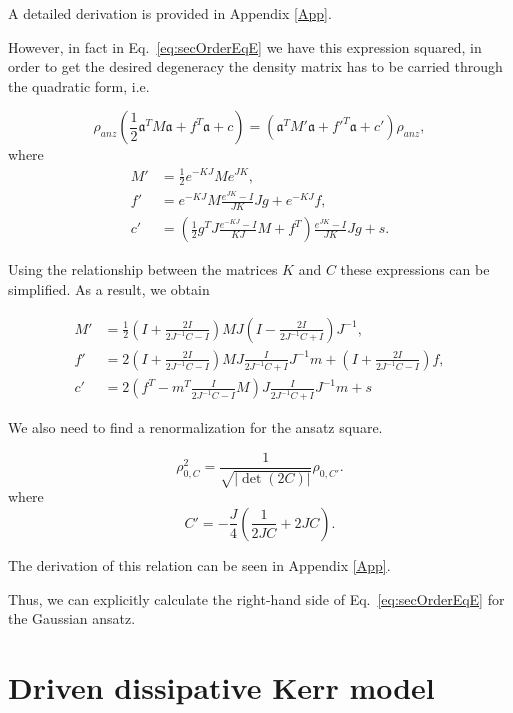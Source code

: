 \documentclass[12pt]{article}
\theoremstyle{definition}
\newcommand{\mf}[1]{\mathfrak{#1}}
\begin{document}
	A detailed derivation is provided in  Appendix \ref{App}.
	
	
	
	However, in fact in Eq.~\eqref{eq:secOrderEqE} we have this expression squared, in order to get the desired degeneracy the density matrix has to be carried through the quadratic form, i.e.
	
	\begin{equation}
		\label{eq:DenMatrOverForm}
		\rho_{anz}(\frac{1}{2}\mf{a}^TM\mf{a} + f^T\mf{a} + c) = (\mf{a}^TM'\mf{a} + f'^T\mf{a} + c')\rho_{anz},
	\end{equation}
	where
	\begin{align*}
		M' &= \frac{1}{2}e^{-KJ}Me^{JK}, \\
		f' &= e^{-KJ}M\frac{e^{JK} - I}{JK}Jg + e^{-KJ}f, \\
		c' &= \left( \frac{1}{2}g^TJ\frac{e^{-KJ} - I}{KJ}M +f^T  \right)\frac{e^{JK} - I}{JK}Jg + s.
	\end{align*}
	
	Using the relationship between the matrices $K$ and $C$ these expressions can be simplified. As a result, we obtain
	
	\begin{align}
		M' &= \frac{1}{2}\left(I + \frac{2I}{2J^{-1}C - I}\right)MJ\left(I - \frac{2I}{2J^{-1}C + I}\right)J^{-1}, \\
		f' &= 2\left(I + \frac{2I}{2J^{-1}C - I}\right)MJ\frac{I}{2J^{-1}C + I}J^{-1}m + \left(I + \frac{2I}{2J^{-1}C - I}\right)f, \\
		c' &= 2\left(f^T - m^T\frac{I}{2J^{-1}C - I}M\right)J\frac{I}{2J^{-1}C + I}J^{-1}m + s
	\end{align}
	
	We also need to find a renormalization for the ansatz square. 
	
	\begin{equation}
		\label{eq:RhoSq}
		\rho_{0,C}^2 = \frac{1}{\sqrt{|\det(2 C)|}} \rho_{0,C'}.
	\end{equation}
	where 
	\begin{equation*}
		C' = - \frac{J}{4}\left(\frac{1}{2 J C} + 2 J C\right).
	\end{equation*}
	
	The derivation of this relation can be seen in Appendix \ref{App}.
	
	Thus, we can   explicitly calculate the right-hand side of Eq.~\eqref{eq:secOrderEqE} for the Gaussian ansatz.
	
	
	\section{\label{sec:ConsideredSystem}  Driven dissipative Kerr model}
	
\end{document}
